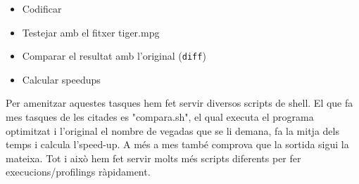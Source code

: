 \begin{itemize}
  \item Codificar
  \item Testejar amb el fitxer tiger.mpg
  \item Comparar el resultat amb l'original (\texttt{diff})
  \item Calcular speedups
\end{itemize}

Per amenitzar aquestes tasques hem fet servir diversos scripts de shell. El que fa mes tasques de les citades es "compara.sh", el qual executa el programa optimitzat i l'original el nombre de vegadas que se li demana, fa la mitja dels temps i calcula l'speed-up. A més a mes també comprova que la sortida sigui la mateixa. Tot i això hem fet servir molts més scripts diferents per fer execucions/profilings ràpidament.
